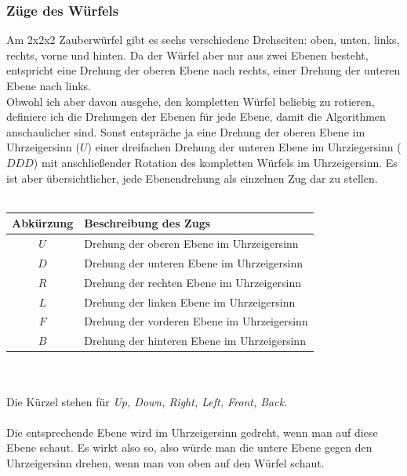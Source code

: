 \documentclass[12pt,a4paper, usenames, dvipsnames]{article}
\begin{document}
\subsubsection*{Züge des Würfels}
Am 2x2x2 Zauberwürfel gibt es sechs verschiedene Drehseiten: oben, unten, links, rechts, vorne und hinten. Da der Würfel aber nur aus zwei Ebenen besteht, entspricht eine Drehung der oberen Ebene nach rechts, einer Drehung der unteren Ebene nach links. \\
Obwohl ich aber davon ausgehe, den kompletten Würfel beliebig zu rotieren, definiere ich die Drehungen der Ebenen für jede Ebene, damit die Algorithmen anschaulicher sind. Sonst entspräche ja eine Drehung der oberen Ebene im Uhrzeigersinn ($U$) einer dreifachen Drehung der unteren Ebene im Uhrziegersinn ($DDD$) mit anschließender Rotation des kompletten Würfels im Uhrzeigersinn. Es ist aber übersichtlicher, jede Ebenendrehung als einzelnen Zug dar zu stellen. \\
\\
\begin{tabular}{|c|l|}
\hline
Abkürzung & Beschreibung des Zugs \\
\hline
\hline
$U$ & Drehung der oberen Ebene im Uhrzeigersinn \\
\hline
$D$ & Drehung der unteren Ebene im Uhrzeigersinn \\
\hline
$R$ & Drehung der rechten Ebene im Uhrzeigersinn \\
\hline
$L$ & Drehung der linken Ebene im Uhrzeigersinn \\%
\hline
$F$ & Drehung der vorderen Ebene im Uhrzeigersinn \\
\hline
$B$ & Drehung der hinteren Ebene im Uhrzeigersinn \\
\hline
\end{tabular} \\
\\
Die Kürzel stehen für \textit{Up, Down, Right, Left, Front, Back}.  \\
\\
Die entsprechende Ebene wird im Uhrzeigersinn gedreht, wenn man auf diese Ebene schaut. Es wirkt also so, also würde man die untere Ebene gegen den Uhrzeigersinn drehen, wenn man von oben auf den Würfel schaut. 
\newpage










\end{document}
